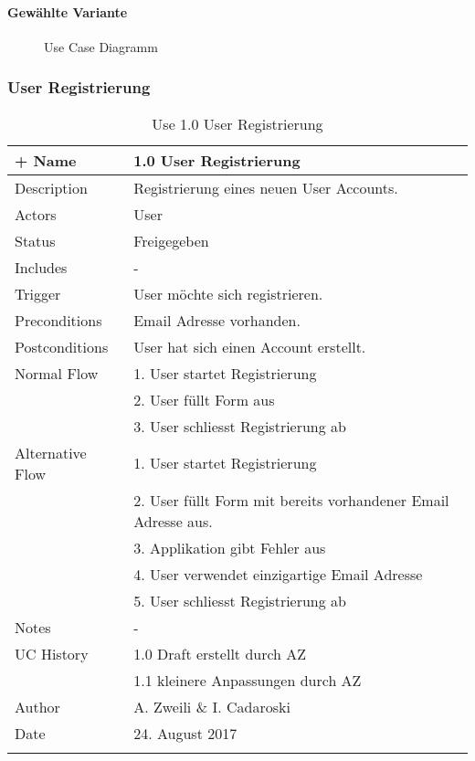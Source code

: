 \paragraph{Gewählte Variante}
\begin{landscape}

\begin{figure}
  \centering
  \caption{Use Case Diagramm\label{fig:use_case}}
\end{figure}
\end{landscape}


\subsubsection{User Registrierung}
{\footnotesize\begin{longtable}{|>{\columncolor[HTML]{EFEFEF}}p{}|p{}|}
  \hline
  {\cellcolor[HTML]{C0C0C0} Identifier} + Name & {\cellcolor[HTML]{C0C0C0} 1.0 User Registrierung} \\ \hline
Description & Registrierung eines neuen User Accounts.\\
\hline
Actors & User\\
\hline
Status & Freigegeben\\
\hline
Includes & -\\
\hline
Trigger & User möchte sich registrieren.\\
\hline
Preconditions & Email Adresse vorhanden.\\
\hline
Postconditions & User hat sich einen Account erstellt.\\
\hline
Normal Flow & 1. User startet Registrierung\\
 & 2. User füllt Form aus\\
 & 3. User schliesst Registrierung ab\\
\hline
Alternative Flow & 1. User startet Registrierung\\
 & 2. User füllt Form mit bereits vorhandener Email Adresse aus.\\
 & 3. Applikation gibt Fehler aus\\
 & 4. User verwendet einzigartige Email Adresse\\
 & 5. User schliesst Registrierung ab\\
\hline
Notes & -\\
\hline
UC History & 1.0 Draft erstellt durch AZ\\
 & 1.1 kleinere Anpassungen durch AZ\\
\hline
Author & A. Zweili \& I. Cadaroski\\
\hline
Date & 24. August 2017\\
\hline
\caption{Use 1.0 User Registrierung}
\end{longtable}}
\newpage


